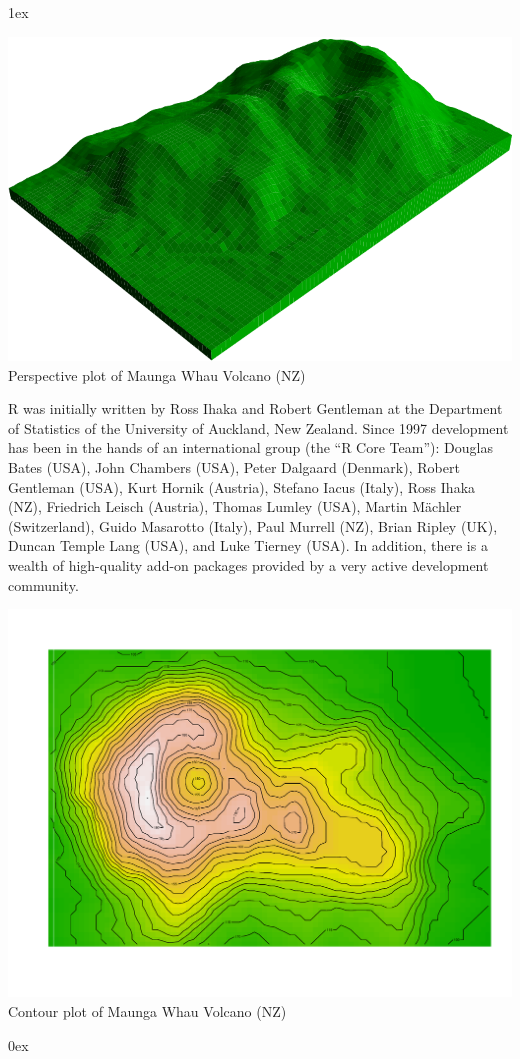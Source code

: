 \documentclass[landscape]{article}
\newlength{\colw}
\newcommand{\column}[1]{\hspace*{9mm}{}
  \parbox[t][0.99\textheight][t]{\colw}{\parskip1ex
    #1\parskip0ex}\hspace{9mm}{}}
\begin{document}
\column{
  \begin{center}
    \footnotesize\sf
    \includegraphics[width=0.85\colw]{volcano-persp}\\
    Perspective plot of Maunga Whau Volcano (NZ)
  \end{center}

  R was initially written by Ross Ihaka and Robert Gentleman at the
  Department of Statistics of the University of Auckland, New Zealand.
  Since 1997 development has been in the hands of an international
  group (the ``R Core Team''): Douglas Bates (USA), John Chambers
  (USA), Peter Dalgaard (Denmark), Robert Gentleman (USA), Kurt Hornik
  (Austria), Stefano Iacus (Italy), Ross Ihaka (NZ), Friedrich Leisch
  (Austria), Thomas Lumley (USA), Martin M{\"a}chler (Switzerland), Guido
  Masarotto (Italy), Paul Murrell (NZ), Brian Ripley (UK), Duncan
  Temple Lang (USA), and Luke Tierney (USA).  In addition, there is a
  wealth of high-quality add-on packages provided by a very active
  development community.
  \begin{center}
    \footnotesize\sf
    \includegraphics[width=0.85\colw]{volcano-image}\\
    Contour plot of Maunga Whau Volcano (NZ)
  \end{center}
}
\end{document}
